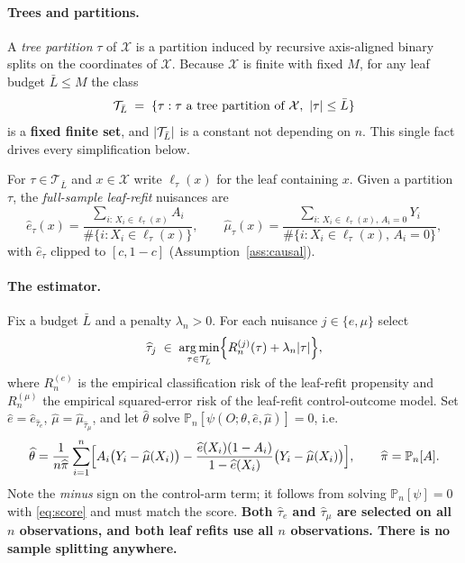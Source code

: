 \documentclass[11pt]{article}
\theoremstyle{plain}
\theoremstyle{definition}
\theoremstyle{remark}
\newcommand{\Pn}{\mathbb{P}_n}
\newcommand{\cX}{\mathcal{X}}
\newcommand{\cT}{\mathcal{T}}
\newcommand{\ehat}{\widehat{e}}
\newcommand{\mhat}{\widehat{\mu}}
\newcommand{\that}{\widehat{\tau}}
\newcommand{\thetahat}{\widehat{\theta}}
\DeclareMathOperator*{\argmin}{arg\,min}
\DeclarePairedDelimiter{\card}{\lvert}{\rvert}
\begin{document}
\paragraph{Trees and partitions.}
A \emph{tree partition} $\tau$ of $\cX$ is a partition induced by recursive
axis-aligned binary splits on the coordinates of $\cX$. Because $\cX$ is finite
with fixed $M$, for any leaf budget $\bar L\le M$ the class
\[
  \cT_{\bar L} \;=\; \{\tau : \tau \text{ a tree partition of } \cX,\ \card{\tau}\le \bar L\}
\]
is a \textbf{fixed finite set}, and $\card{\cT_{\bar L}}$ is a constant not
depending on $n$. This single fact drives every simplification below.

For $\tau\in\cT_{\bar L}$ and $x\in\cX$ write $\ell_\tau(x)$ for the leaf
containing $x$. Given a partition $\tau$, the \emph{full-sample leaf-refit}
nuisances are
\begin{equation}\label{eq:refit}
  \ehat_\tau(x) = \frac{\sum_{i:\,X_i\in \ell_\tau(x)} A_i}{\#\{i: X_i\in\ell_\tau(x)\}},
  \qquad
  \mhat_\tau(x) = \frac{\sum_{i:\,X_i\in \ell_\tau(x),\,A_i=0} Y_i}
                        {\#\{i: X_i\in\ell_\tau(x),\,A_i=0\}} ,
\end{equation}
with $\ehat_\tau$ clipped to $[c,1-c]$ (Assumption~\ref{ass:causal}).

\paragraph{The estimator.}
Fix a budget $\bar L$ and a penalty $\lambda_n>0$. For each nuisance
$j\in\{e,\mu\}$ select
\begin{equation}\label{eq:select}
  \that_j \;\in\; \argmin_{\tau\in\cT_{\bar L}}
  \Bigl\{ R_n^{(j)}(\tau) + \lambda_n\card{\tau} \Bigr\},
\end{equation}
where $R_n^{(e)}$ is the empirical classification risk of the leaf-refit
propensity and $R_n^{(\mu)}$ the empirical squared-error risk of the leaf-refit
control-outcome model. Set $\ehat=\ehat_{\that_e}$, $\mhat=\mhat_{\that_\mu}$,
and let $\thetahat$ solve $\Pn[\psi(O;\theta,\ehat,\mhat)]=0$, i.e.\
\begin{equation}\label{eq:estimator}
  \thetahat
  = \frac{1}{n\widehat\pi}\sum_{i=1}^n\Bigl[
      A_i\bigl(Y_i-\mhat(X_i)\bigr)
      - \frac{\ehat(X_i)(1-A_i)}{1-\ehat(X_i)}\bigl(Y_i-\mhat(X_i)\bigr)\Bigr],
  \qquad \widehat\pi = \Pn[A].
\end{equation}
Note the \emph{minus} sign on the control-arm term; it follows from solving
$\Pn[\psi]=0$ with \eqref{eq:score} and must match the score.
\textbf{Both $\that_e$ and $\that_\mu$ are selected on all $n$ observations, and
both leaf refits use all $n$ observations. There is no sample splitting anywhere.}
\end{document}
